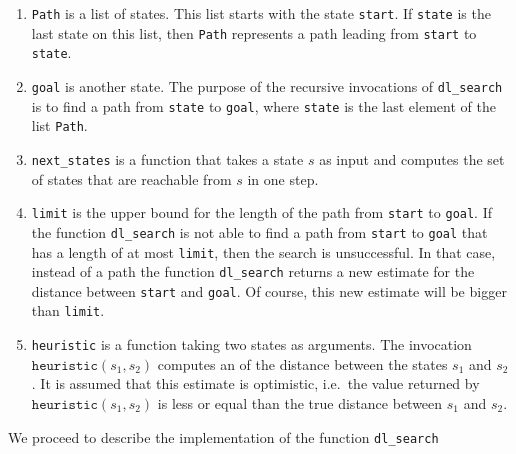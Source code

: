\begin{enumerate}
\item \texttt{Path} is a list of states.  This list starts with the state \texttt{start}.
      If \texttt{state} is the last state on this list, then \texttt{Path} represents a path leading from
      \texttt{start} to \texttt{state}.
\item \texttt{goal} is another state.  The purpose of the recursive invocations of \texttt{dl\_search} is to
      find a path from \texttt{state} to \texttt{goal}, where \texttt{state} is the last element of the
      list \texttt{Path}.
\item \texttt{next\_states} is a function that takes a state $s$ as input and computes the set of states that are
      reachable from $s$ in one step.
\item \texttt{limit} is the upper bound for the length of the path from \texttt{start} to \texttt{goal}.  If the
      function \texttt{dl\_search} is not able to find a path from \texttt{start} to \texttt{goal} that has
      a length of at most \texttt{limit}, then the search is unsuccessful.  In that case, instead of a path
      the function \texttt{dl\_search} returns a new estimate for the distance between \texttt{start} and
      \texttt{goal}.  Of course, this new estimate will be bigger than \texttt{limit}.
\item \texttt{heuristic} is a function taking two states as arguments.  The invocation
      $\texttt{heuristic}(s_1, s_2)$ computes an  of the distance between the states $s_1$ and $s_2$.  It is
      assumed that this estimate is optimistic, i.e.~the value returned by $\texttt{heuristic}(s_1, s_2)$
      is less or equal than the true distance between $s_1$ and $s_2$.
\end{enumerate}
We proceed to describe the implementation of the function \texttt{dl\_search}
